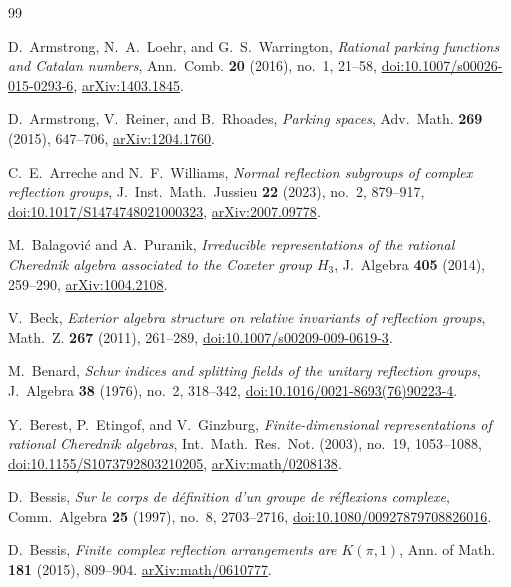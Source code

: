 \documentclass[10pt,a4paper]{amsart}
\theoremstyle{definition}
\begin{document}
\clearpage
\begingroup\raggedbottom
\begin{thebibliography}{99}
\raggedright
{}
D.~Armstrong, N.~A.~Loehr, and G.~S.~Warrington,
\emph{Rational parking functions and Catalan numbers},
Ann.~Comb. \textbf{20} (2016), no.~1, 21--58,
\href{https://doi.org/10.1007/s00026-015-0293-6}{doi:10.1007/s00026-015-0293-6},
\href{https://arxiv.org/abs/1403.1845}{arXiv:1403.1845}.

D.~Armstrong, V.~Reiner, and B.~Rhoades,
\emph{Parking spaces}, Adv.~Math. \textbf{269} (2015), 647--706,
\href{https://arxiv.org/abs/1204.1760}{arXiv:1204.1760}.

C.~E.~Arreche and N.~F.~Williams,
\emph{Normal reflection subgroups of complex reflection groups},
J.~Inst.~Math.~Jussieu \textbf{22} (2023), no.~2, 879--917,
\href{https://doi.org/10.1017/S1474748021000323}{doi:10.1017/S1474748021000323},
\href{https://arxiv.org/abs/2007.09778}{arXiv:2007.09778}.

M.~Balagovi\'c and A.~Puranik,
\emph{Irreducible representations of the rational Cherednik algebra
associated to the Coxeter group $H_3$},
J.~Algebra \textbf{405} (2014), 259--290,
\href{https://arxiv.org/abs/1004.2108}{arXiv:1004.2108}.

V.~Beck,
\emph{Exterior algebra structure on relative invariants of reflection groups},
Math.~Z. \textbf{267} (2011), 261--289,
\href{https://doi.org/10.1007/s00209-009-0619-3}{doi:10.1007/s00209-009-0619-3}.

M.~Benard,
\emph{Schur indices and splitting fields of the unitary reflection groups},
J.~Algebra \textbf{38} (1976), no.~2, 318--342,
\href{https://doi.org/10.1016/0021-8693(76)90223-4}{doi:10.1016/0021-8693(76)90223-4}.

Y.~Berest, P.~Etingof, and V.~Ginzburg,
\emph{Finite-dimensional representations of rational Cherednik algebras},
Int.~Math.~Res.~Not. (2003), no.~19, 1053--1088,
\href{https://doi.org/10.1155/S1073792803210205}{doi:10.1155/S1073792803210205},
\href{https://arxiv.org/abs/math/0208138}{arXiv:math/0208138}.

D.~Bessis,
\emph{Sur le corps de d\'efinition d'un groupe de r\'eflexions complexe},
Comm.~Algebra \textbf{25} (1997), no.~8, 2703--2716,
\href{https://doi.org/10.1080/00927879708826016}{doi:10.1080/00927879708826016}.

D.~Bessis,
\emph{Finite complex reflection arrangements are $K(\pi,1)$},
Ann. of Math. \textbf{181} (2015), 809--904.
\href{https://arxiv.org/abs/math/0610777}{arXiv:math/0610777}.


\end{thebibliography}
\end{document}
